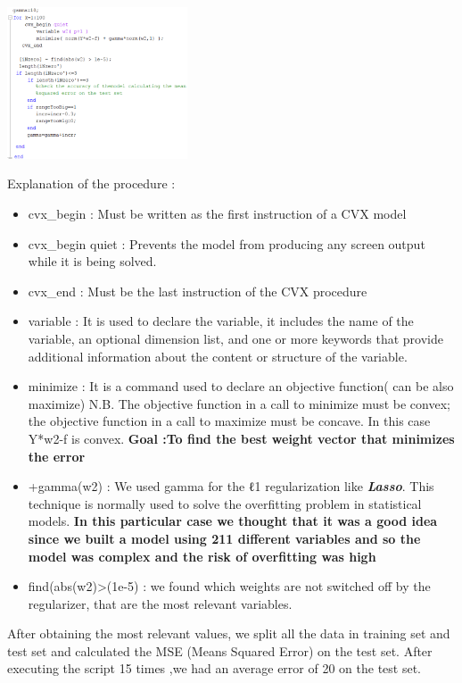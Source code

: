 \includegraphics[width=0.4\textwidth]{ccc.png}

Explanation of the procedure : 

\begin{itemize}
\item cvx\_begin : Must be written as the first instruction of a CVX model
\item cvx\_begin quiet : Prevents the model from producing any screen output while it is being solved.
\item cvx\_end : Must be the last instruction of the CVX procedure 
\item variable : It is used to declare the variable, it includes the name of the variable, an optional dimension list, and one or more keywords that provide additional information about the content or structure of the variable.
\item minimize : It is a command used to declare an objective function( can be also maximize) 
N.B. The objective function in a call to minimize must be convex; the objective function in a call to maximize must be concave. In this case Y*w2-f is convex.
\textbf{Goal :To find the best weight vector that minimizes the error }
\item +gamma(w2) : We used gamma for the ℓ1 regularization like \textit{\textbf{Lasso}}. This technique is normally used to solve the overfitting problem in statistical models. \textbf{In this particular case we thought that it was a good idea since we built a model using 211 different variables and so the model was complex and the risk of overfitting was high}
\item find(abs(w2)\textgreater(1e-5) : we found which weights are not switched off by the regularizer, that are the most relevant variables. 
\end{itemize}

After obtaining the most relevant values, we split all the data in training set and test set and calculated the MSE (Means Squared Error) on the test set. After executing the script 15 times ,we had an average error of 20 on the test set\cite{rossi2013exchange}. 


